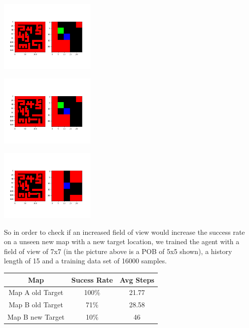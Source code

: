 \documentclass[a4paper]{article}
\begin{document}
\begin{itemize}
\begin{itemize}
\begin{minipage}[t]{0.3\textwidth}
\includegraphics[height=3.5cm,width=\textwidth]{map_a_old_target.png}
\end{minipage}
\begin{minipage}[t]{0.3\textwidth}
\includegraphics[height=3.5cm,width=\textwidth]{map_b_old_target.png}
\end{minipage}
\begin{minipage}[t]{0.3\textwidth}
\includegraphics[height=3.5cm,width=\textwidth]{map_b_new_target.png}
\end{minipage}

So in order to check if an increased field of view would increase the success rate on a unseen new map with a new target location, we trained the agent with a field of view of 7x7 (in the picture above is a POB of 5x5 shown), a history length of 15 and a training data set of 16000 samples. \\
\begin{center}
\begin{tabular}{|c|c|c|}
\hline 
Map & Sucess Rate & Avg Steps \\ 
\hline 
Map A old Target & 100\% & 21.77 \\ 
\hline 
Map B old Target & 71\% & 28.58 \\ 
\hline 
Map B new Target & 10\% & 46 \\ 
\hline 
\end{tabular} 
\end{center}


\end{itemize}
\end{itemize}
\end{document}
